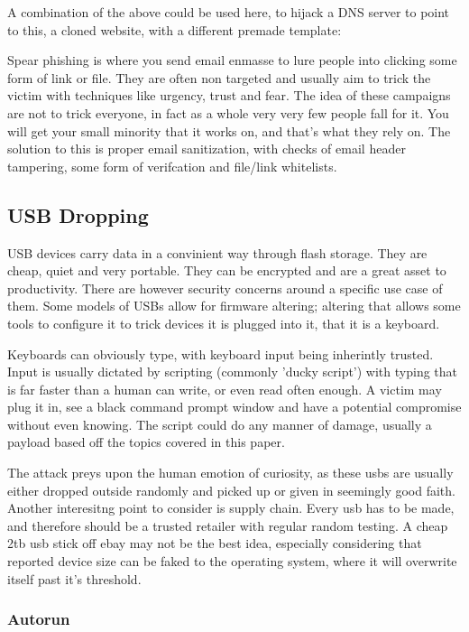 A combination of the above could be used here, to hijack a DNS server to point to this, a cloned website, with a different premade template:

Spear phishing is where you send email enmasse to lure people into clicking some form of link or file. They are often non targeted and usually aim to trick the victim with techniques like urgency, trust and fear. The idea of these campaigns are not to trick everyone, 
in fact as a whole very very few people fall for it. You will get your small minority that it works on, and that's what they rely on. The solution to this is proper email sanitization, with checks of email header tampering, some form of verifcation and file/link whitelists.

\subsection{USB Dropping}
USB devices carry data in a convinient way through flash storage. They are cheap, quiet and very portable. They can be encrypted and are a great asset to productivity. 
There are however security concerns around a specific use case of them. Some models of USBs allow for firmware altering; altering that allows some tools to configure it to trick
devices it is plugged into it, that it is a keyboard. 

Keyboards can obviously type, with keyboard input being inherintly trusted. Input is usually dictated by scripting (commonly 'ducky script')
with typing that is far faster than a human can write, or even read often enough. A victim may plug it in, see a black command prompt window and have a potential compromise without even knowing. 
The script could do any manner of damage, usually a payload based off the topics covered in this paper. 

The attack preys upon the human emotion of curiosity, as these usbs are usually either dropped outside randomly and picked up or given in seemingly good faith. Another interesitng point to consider is supply chain.
Every usb has to be made, and therefore should be a trusted retailer with regular random testing. A cheap 2tb usb stick off ebay may not be the best idea, especially considering that reported device size can be faked to the operating system,
where it will overwrite itself past it's threshold.

\subsubsection{Autorun}
